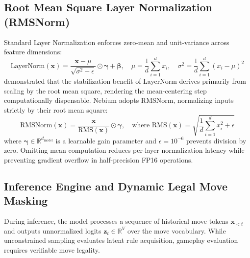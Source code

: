 \subsection{Root Mean Square Layer Normalization (RMSNorm)}
\label{sec:rmsnorm_method}
Standard Layer Normalization enforces zero-mean and unit-variance across feature dimensions:
\begin{equation}
    \text{LayerNorm}(\mathbf{x}) = \frac{\mathbf{x} - \mu}{\sqrt{\sigma^2 + \epsilon}} \odot \boldsymbol{\gamma} + \boldsymbol{\beta}, \quad \mu = \frac{1}{d}\sum_{i=1}^d x_i, \quad \sigma^2 = \frac{1}{d}\sum_{i=1}^d (x_i - \mu)^2
\end{equation}
\textcite{zhang2019root} demonstrated that the stabilization benefit of LayerNorm derives primarily from scaling by the root mean square, rendering the mean-centering step computationally dispensable. Nebium adopts RMSNorm, normalizing inputs strictly by their root mean square:
\begin{equation}
    \text{RMSNorm}(\mathbf{x}) = \frac{\mathbf{x}}{\text{RMS}(\mathbf{x})} \odot \boldsymbol{\gamma}, \quad \text{where } \text{RMS}(\mathbf{x}) = \sqrt{\frac{1}{d}\sum_{i=1}^d x_i^2 + \epsilon}
\end{equation}
where $\boldsymbol{\gamma} \in \mathbb{R}^{d_{\text{model}}}$ is a learnable gain parameter and $\epsilon = 10^{-6}$ prevents division by zero. Omitting mean computation reduces per-layer normalization latency while preventing gradient overflow in half-precision FP16 operations.

\subsection{Inference Engine and Dynamic Legal Move Masking}
\label{sec:legal_masking}
During inference, the model processes a sequence of historical move tokens $\mathbf{x}_{<t}$ and outputs unnormalized logits $\mathbf{z}_t \in \mathbb{R}^V$ over the move vocabulary. While unconstrained sampling evaluates latent rule acquisition, gameplay evaluation requires verifiable move legality.

